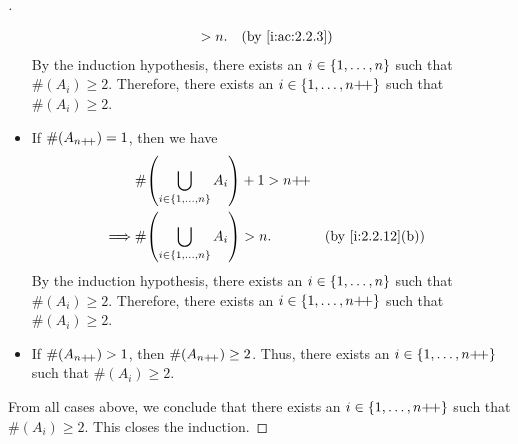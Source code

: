 \begin{proof}[]
\begin{itemize}
\begin{align*}
                                                            & > n.                                           &  & \by{i:ac:2.2.3}
          \end{align*}
          By the induction hypothesis, there exists an \(i \in \left\lbrace1, \dots, n\right\rbrace\) such that \(\#(A_i) \geq 2\).
          Therefore, there exists an \(i \in \left\lbrace1, \dots, n{+}\!{+}\right\rbrace\) such that \(\#(A_i) \geq 2\).
    \item If \(\#(A_{n{+}\!{+}}) = 1\), then we have
          \begin{align*}
                     & \#\pa{\bigcup_{i \in \set{1, \dots, n}} A_i} + 1 > n\pp                       \\
            \implies & \#\pa{\bigcup_{i \in \set{1, \dots, n}} A_i} > n.       &  & \by{i:2.2.12}[b]
          \end{align*}
          By the induction hypothesis, there exists an \(i \in \left\lbrace1, \dots, n\right\rbrace\) such that \(\#(A_i) \geq 2\).
          Therefore, there exists an \(i \in \left\lbrace1, \dots, n{+}\!{+}\right\rbrace\) such that \(\#(A_i) \geq 2\).
    \item If \(\#(A_{n{+}\!{+}}) > 1\), then \(\#(A_{n{+}\!{+}}) \geq 2\).
          Thus, there exists an \(i \in \left\lbrace1, \dots, n{+}\!{+}\right\rbrace\) such that \(\#(A_i) \geq 2\).
  \end{itemize}
  From all cases above, we conclude that there exists an \(i \in \left\lbrace1, \dots, n{+}\!{+}\right\rbrace\) such that \(\#(A_i) \geq 2\).
  This closes the induction.
\end{proof}
